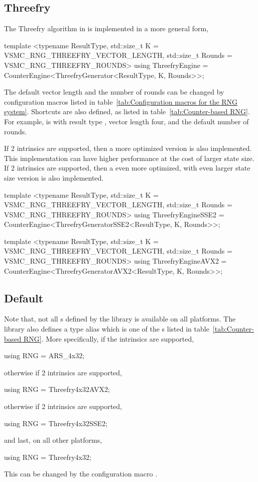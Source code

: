 \subsection{Threefry}
\label{sub:Threefry}

The Threefry algorithm in \textcite{Salmon:2011um} is implemented in a more
general form,
\begin{cppcode}
  template <typename ResultType, std::size_t K = VSMC_RNG_THREEFRY_VECTOR_LENGTH,
      std::size_t Rounds = VSMC_RNG_THREEFRY_ROUNDS>
  using ThreefryEngine = CounterEngine<ThreefryGenerator<ResultType, K, Rounds>>;
\end{cppcode}
The default vector length and the number of rounds can be changed by
configuration macros listed in table~\ref{tab:Configuration macros for the RNG
  system}. Shortcuts are also defined, as listed in
table~\ref{tab:Counter-based RNG}. For example,  is
 with result type , vector
length four, and the default number of rounds.

If \sse{}2 intrinsics are supported, then a more optimized version is also
implemented. This implementation can have higher performance at the cost of
larger state size. If \avx{}2 intrinsics are supported, then a even more
optimized, with even larger state size version is also implemented.
\begin{cppcode}
  template <typename ResultType, std::size_t K = VSMC_RNG_THREEFRY_VECTOR_LENGTH,
      std::size_t Rounds = VSMC_RNG_THREEFRY_ROUNDS>
  using ThreefryEngineSSE2 =
      CounterEngine<ThreefryGeneratorSSE2<ResultType, K, Rounds>>;

  template <typename ResultType, std::size_t K = VSMC_RNG_THREEFRY_VECTOR_LENGTH,
      std::size_t Rounds = VSMC_RNG_THREEFRY_ROUNDS>
  using ThreefryEngineAVX2 =
      CounterEngine<ThreefryGeneratorAVX2<ResultType, K, Rounds>>;
\end{cppcode}

\subsection{Default \protect\rng}
\label{sub:Default RNG}

Note that, not all \rng{}s defined by the library is available on all
platforms. The library also defines a type alias  which is one
of the \rng{}s listed in table~\ref{tab:Counter-based RNG}. More specifically,
if the \aesni intrinsics are supported,
\begin{cppcode}
  using RNG = ARS_4x32;
\end{cppcode}
otherwise if \avx{}2 intrinsics are supported,
\begin{cppcode}
  using RNG = Threefry4x32AVX2;
\end{cppcode}
otherwise if \sse{}2 intrinsics are supported,
\begin{cppcode}
  using RNG = Threefry4x32SSE2;
\end{cppcode}
and last, on all other platforms,
\begin{cppcode}
  using RNG = Threefry4x32;
\end{cppcode}
This can be changed by the configuration macro .

